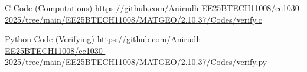 \documentclass{beamer}
\begin{document}
\begin{frame}[fragile]{C Code (Computations)}
\url{https://github.com/Anirudh-EE25BTECH11008/ee1030-2025/tree/main/EE25BTECH11008/MATGEO/2.10.37/Codes/verify.c}
\end{frame}

\begin{frame}[fragile]{Python Code (Verifying)}
\url{https://github.com/Anirudh-EE25BTECH11008/ee1030-2025/tree/main/EE25BTECH11008/MATGEO/2.10.37/Codes/verify.py}
\end{frame}
\end{document}
